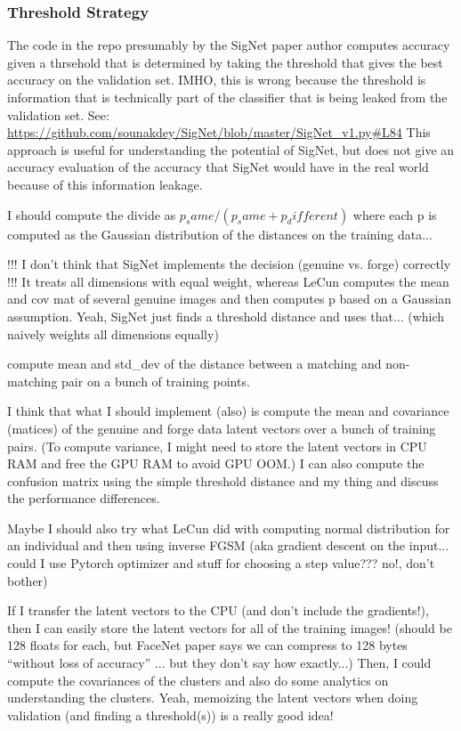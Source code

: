 \subsubsection{Threshold Strategy}
The code in the repo presumably by the SigNet paper author computes accuracy given a thrsehold that is determined by taking the threshold that gives the best accuracy on the validation set.
IMHO, this is wrong because the threshold is information that is technically part of the classifier that is being leaked from the validation set.
See: \url{https://github.com/sounakdey/SigNet/blob/master/SigNet_v1.py#L84}
This approach is useful for understanding the potential of SigNet, but does not give an accuracy evaluation of the accuracy that SigNet would have in the real world because of this information leakage.


I should compute the divide as $p_same / (p_same + p_different)$ where each p is computed as the Gaussian distribution of the distances on the training data...

!!! I don't think that SigNet implements the decision (genuine vs. forge) correctly !!!
It treats all dimensions with equal weight, whereas LeCun computes the mean and cov mat of several genuine images and then computes p based on a Gaussian assumption.
Yeah, SigNet just finds a threshold distance and uses that... (which naively weights all dimensions equally)

compute mean and std\_dev of the distance between a matching and non-matching pair on a bunch of training points.

I think that what I should implement (also) is compute the mean and covariance (matices) of the genuine and forge data latent vectors over a bunch of training pairs. (To compute variance, I might need to store the latent vectors in CPU RAM and free the GPU RAM to avoid GPU OOM.)
I can also compute the confusion matrix using the simple threshold distance and my thing and discuss the performance differences.

Maybe I should also try what LeCun did with computing normal distribution for an individual and then using inverse FGSM (aka gradient descent on the input... could I use Pytorch optimizer and stuff for choosing a step value??? no!, don't bother)

If I transfer the latent vectors to the CPU (and don't include the gradients!), then I can easily store the latent vectors for all of the training images!
(should be 128 floats for each, but FaceNet paper says we can compress to 128 bytes ``without loss of accuracy'' ... but they don't say how exactly...)
Then, I could compute the covariances of the clusters and also do some analytics on understanding the clusters.
Yeah, memoizing the latent vectors when doing validation (and finding a threshold(s)) is a really good idea!

